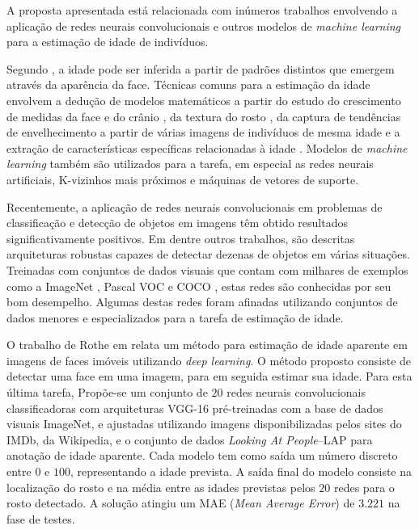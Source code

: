 A proposta apresentada está relacionada com inúmeros trabalhos envolvendo a aplicação de redes neurais convolucionais e outros modelos de \emph{machine learning} para a estimação de idade de indivíduos.

Segundo \cite{fu2010age}, a idade pode ser inferida a partir de padrões distintos que emergem através da aparência da face. Técnicas comuns para a estimação da idade envolvem a dedução de modelos matemáticos a partir do estudo do crescimento de medidas da face e do crânio \cite{kwon1999age}, da textura do rosto \cite{lanitis2002toward}, da captura de tendências de envelhecimento a partir de várias imagens de indivíduos de mesma idade \cite{fu2007estimating} e a extração de características específicas relacionadas à idade \cite{suo2008design, lou2018expression}. Modelos de \emph{machine learning} também são utilizados para a tarefa, em especial as redes neurais artificiais, K-vizinhos mais próximos e máquinas de vetores de suporte.

Recentemente, a aplicação de redes neurais convolucionais em problemas de classificação e detecção de objetos em imagens têm obtido resultados significativamente positivos. Em \cite{vggnet, resnet, inception, redmon2016you, ssd} dentre outros trabalhos, são descritas arquiteturas robustas capazes de detectar dezenas de objetos em várias situações. Treinadas com conjuntos de dados visuais que contam com milhares de exemplos como a ImageNet \cite{ImagenetChall}, Pascal VOC \cite{pascalvoc} e COCO \cite{coco}, estas redes são conhecidas por seu bom desempelho. Algumas destas redes foram afinadas utilizando conjuntos de dados menores e especializados para a tarefa de estimação de idade.

O trabalho de Rothe em \cite{rothe2015dex} relata um método para estimação de idade aparente em imagens de faces imóveis utilizando \emph{deep learning}. O método proposto consiste de detectar uma face em uma imagem, para em seguida estimar sua idade. Para esta última tarefa, Propõe-se um conjunto de $20$ redes neurais convolucionais classificadoras com arquiteturas VGG-16 pré-treinadas com a base de dados visuais ImageNet, e ajustadas utilizando imagens disponibilizadas pelos sites do IMDb, da Wikipedia, e o conjunto de dados \emph{Looking At People}--LAP para anotação de idade aparente. Cada modelo tem como saída um número discreto entre $0$ e $100$, representando a idade prevista. A saída final do modelo consiste na localização do rosto e na média entre as idades previstas pelos $20$ redes para o rosto detectado. A solução atingiu um MAE (\emph{Mean Average Error}) de $3.221$ na fase de testes.

